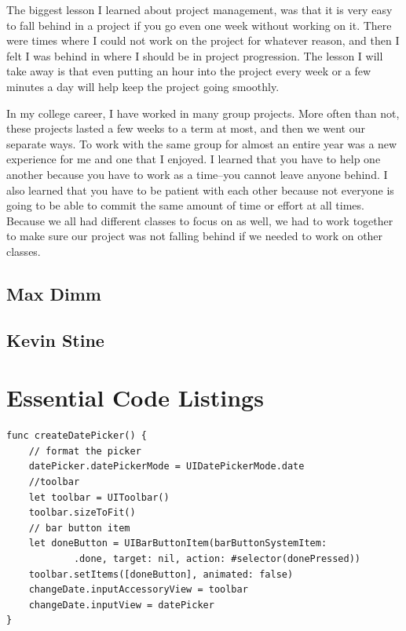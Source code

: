 \documentclass[letterpaper,10pt,draftclsnofoot,onecolumn,titlepage]{IEEEtran}
\begin{document}
		
		The biggest lesson I learned about project management, was that it is very easy to fall behind in a project if you go even one week without working on it. 
		There were times where I could not work on the project for whatever reason, and then I felt I was behind in where I should be in project progression. 
		The lesson I will take away is that even putting an hour into the project every week or a few minutes a day will help keep the project going smoothly. 
		
		In my college career, I have worked in many group projects. 
		More often than not, these projects lasted a few weeks to a term at most, and then we went our separate ways. 
		To work with the same group for almost an entire year was a new experience for me and one that I enjoyed. 
		I learned that you have to help one another because you have to work as a time--you cannot leave anyone behind. 
		I also learned that you have to be patient with each other because not everyone is going to be able to commit the same amount of time or effort at all times. 
		Because we all had different classes to focus on as well, we had to work together to make sure our project was not falling behind if we needed to work on other classes. 
		
	
	\subsection{Max Dimm}
	
	\subsection{Kevin Stine}
	
	
	
	
	
	\appendices
	
	\section{Essential Code Listings}
	
	\begin{lstlisting}[caption=iOS EventViewController Snippet]
func createDatePicker() {
    // format the picker
    datePicker.datePickerMode = UIDatePickerMode.date
    //toolbar
    let toolbar = UIToolbar()
    toolbar.sizeToFit()
    // bar button item
    let doneButton = UIBarButtonItem(barButtonSystemItem:
			.done, target: nil, action: #selector(donePressed))
    toolbar.setItems([doneButton], animated: false)
    changeDate.inputAccessoryView = toolbar
    changeDate.inputView = datePicker
}
\end{lstlisting}
		
\end{document}
